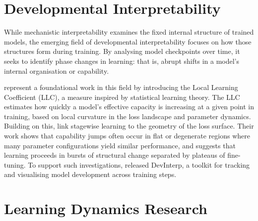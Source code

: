 

\section{Developmental Interpretability}

While mechanistic interpretability examines the fixed internal structure of trained models, the emerging field of developmental interpretability focuses on how those structures form during training. By analysing model checkpoints over time, it seeks to identify phase changes in learning: that is, abrupt shifts in a model's internal organisation or capability.

\citet{hoogland2023towards} represent a foundational work in this field by introducing the Local Learning Coefficient (LLC), a measure inspired by statistical learning theory. The LLC estimates how quickly a model's effective capacity is increasing at a given point in training, based on local curvature in the loss landscape and parameter dynamics. Building on this, \citet{hoogland2025losslandscape} link stagewise learning to the geometry of the loss surface. Their work shows that capability jumps often occur in flat or degenerate regions where many parameter configurations yield similar performance, and suggests that learning proceeds in bursts of structural change separated by plateaus of fine-tuning. To support such investigations, \citet{devinterpcode} released DevInterp, a toolkit for tracking and visualising model development across training steps.

\section{Learning Dynamics Research}

